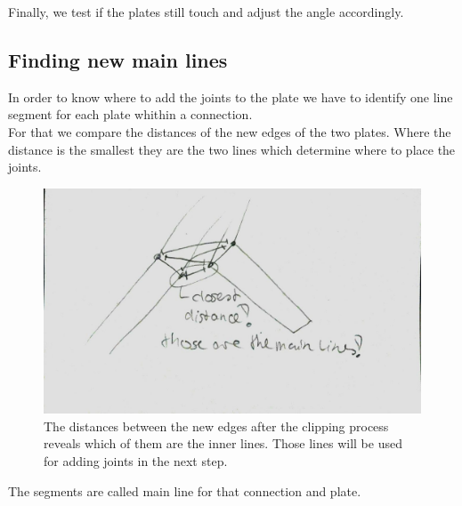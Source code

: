 \documentclass[../ClassicThesis.tex]{subfiles}
\begin{document}
Finally, we test if the plates still touch and adjust the angle accordingly.

\subsection{Finding new main lines}\label{mainLine}
In order to know where to add the joints to the plate we have to identify one line segment for each plate whithin a connection.\\
For that we compare the distances of the new edges of the two plates. Where the distance is the smallest they are the two lines which determine where to place the joints.
\begin{figure}[!ht]
\centering
\includegraphics[width=.5\columnwidth, angle=90]{Images/06-1-graph-mainLinesAfterClipping.jpg}
\caption{The distances between the new edges after the clipping process reveals which of them are the inner lines. Those lines will be used for adding joints in the next step.}
\end{figure}

The segments are called main line for that connection and plate.
\end{document}
